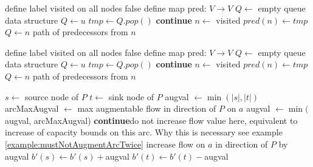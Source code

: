 \begin{algorithm}
 \begin{algorithmic}
    \State define label visited on all nodes false
    \State define map pred: $V\to V$
    \State $Q\gets $ empty queue data structure
    \State $Q\gets u$
      \State $tmp\gets Q.pop()$
	  \State \textbf{continue}
	  \State $n\gets$ visited
	  \State $pred(n)\gets tmp$
	  \State $Q\gets n$
	    \State\Return path of predecessors from $n$
	  \EndIf
	\EndIf
      \EndFor
    \EndWhile
  
  \EndFunction
 \end{algorithmic}
 
\end{algorithm}
\begin{algorithm}
 \begin{algorithmic}
    \State define label visited on all nodes false
    \State define map pred: $V\to V$
    \State $Q\gets $ empty queue data structure
    \State $Q\gets u$
      \State $tmp\gets Q.pop()$
	  \State \textbf{continue}
	  \State $n\gets$ visited
	  \State $pred(n)\gets tmp$
	  \State $Q\gets n$
	    \State\Return path of predecessors from $n$
	  \EndIf
	\EndIf
      \EndFor
    \EndWhile
  
  \EndFunction
 \end{algorithmic}
\end{algorithm}
\begin{algorithm}
 \begin{algorithmic}
    \State $s\gets $ source node of $P$
    \State $t\gets $ sink node of $P$
    \State augval $\gets \min(|s|,|t|)$
      \State arcMaxAugval $\gets$ max augmentable flow in direction of $P$ on $a$ 
      \State augval $\gets \min($augval, arcMaxAugval)
    \EndFor
	\State \textbf{continue}\Comment do not increase flow value here, equivalent to increase of capacity bounds on 
		this arc. Why this is necessary see example \ref{example:mustNotAugmentArcTwice}
      \EndIf
      \State increase flow on $a$ in direction of $P$ by augval
    \EndFor
    \State $b'(s)\gets b'(s) + $augval
    \State $b'(t)\gets b'(t) - $augval
  \EndFunction
 \end{algorithmic}
 
\end{algorithm}


